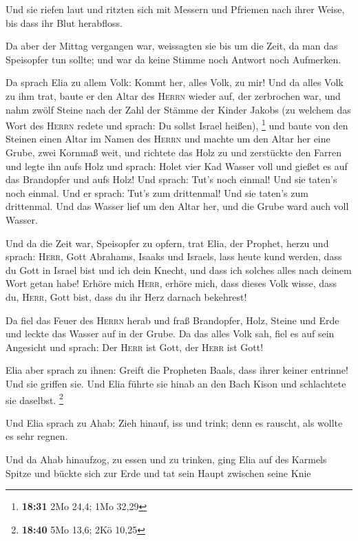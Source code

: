  Und sie riefen laut und ritzten sich mit Messern und
Pfriemen nach ihrer Weise, bis dass ihr Blut herabfloss.

 Da aber der Mittag vergangen war, weissagten sie bis um
die Zeit, da man das Speisopfer tun sollte; und war da keine Stimme noch
Antwort noch Aufmerken.

 Da sprach Elia zu allem Volk: Kommt her, alles Volk, zu
mir! Und da alles Volk zu ihm trat, baute er den Altar des
\textsc{Herrn} wieder auf, der zerbrochen war,  und nahm
zwölf Steine nach der Zahl der Stämme der Kinder Jakobs (zu welchem das
Wort des \textsc{Herrn} redete und sprach: Du sollst Israel heißen),
\footnote{\textbf{18:31} 2Mo 24,4; 1Mo 32,29}  und baute
von den Steinen einen Altar im Namen des \textsc{Herrn} und machte um
den Altar her eine Grube, zwei Kornmaß weit,  und
richtete das Holz zu und zerstückte den Farren und legte ihn aufs Holz
 und sprach: Holet vier Kad Wasser voll und gießet es auf
das Brandopfer und aufs Holz! Und sprach: Tut's noch einmal! Und sie
taten's noch einmal. Und er sprach: Tut's zum drittenmal! Und sie
taten's zum drittenmal.  Und das Wasser lief um den Altar
her, und die Grube ward auch voll Wasser.

 Und da die Zeit war, Speisopfer zu opfern, trat Elia,
der Prophet, herzu und sprach: \textsc{Herr}, Gott Abrahams, Isaaks und
Israels, lass heute kund werden, dass du Gott in Israel bist und ich
dein Knecht, und dass ich solches alles nach deinem Wort getan habe!
 Erhöre mich \textsc{Herr}, erhöre mich, dass dieses Volk
wisse, dass du, \textsc{Herr}, Gott bist, dass du ihr Herz darnach
bekehrest!

 Da fiel das Feuer des \textsc{Herrn} herab und fraß
Brandopfer, Holz, Steine und Erde und leckte das Wasser auf in der
Grube.  Da das alles Volk sah, fiel es auf sein Angesicht
und sprach: Der \textsc{Herr} ist Gott, der \textsc{Herr} ist Gott!

 Elia aber sprach zu ihnen: Greift die Propheten Baals,
dass ihrer keiner entrinne! Und sie griffen sie. Und Elia führte sie
hinab an den Bach Kison und schlachtete sie daselbst. \footnote{\textbf{18:40}
  5Mo 13,6; 2Kö 10,25}

 Und Elia sprach zu Ahab: Zieh hinauf, iss und trink;
denn es rauscht, als wollte es sehr regnen.

 Und da Ahab hinaufzog, zu essen und zu trinken, ging
Elia auf des Karmels Spitze und bückte sich zur Erde und tat sein Haupt
zwischen seine Knie

